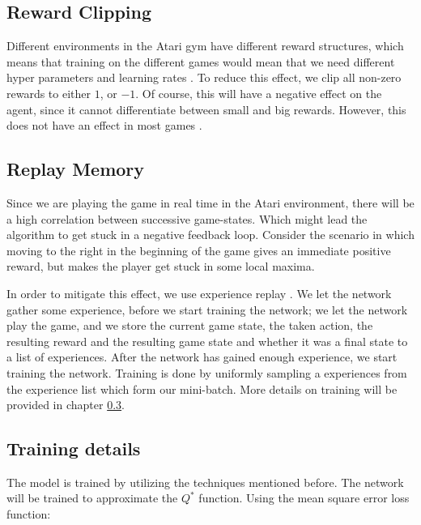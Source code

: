 \documentclass{article}
\begin{document}
\subsection{Reward Clipping}

Different environments in the Atari gym have different reward structures, which means that training on the different games would mean that we need different hyper parameters and learning rates . To reduce this effect, we clip all non-zero rewards to either $1$, or $-1$. Of course, this will have a negative effect on the agent, since it cannot differentiate between small and big rewards. However, this does not have an effect in most games \cite{mnih2015human}.


\subsection{Replay Memory}
Since we are playing the game in real time in the Atari environment, there will be a high correlation between successive game-states. Which might lead the algorithm to get stuck in a negative feedback loop. Consider the scenario in which moving to the right in the beginning of the game gives an immediate positive reward, but makes the player get stuck in some local maxima.

In order to mitigate this effect, we use experience replay \cite{mnih2013playing}. We let the network gather some experience, before we start training the network; we let the network play the game, and we store the current game state, the taken action, the resulting reward and the resulting game state and whether it was a final state to a list of experiences. After the network has gained enough experience, we start training the network. Training is done by uniformly sampling a experiences from the experience list which form our mini-batch. More details on training will be provided in chapter \ref{chapter:training}.

\subsection{Training details} \label{chapter:training}

The model is trained by utilizing the techniques mentioned before. The network will be trained to approximate the $Q^*$ function. Using the mean square error loss function:
\end{document}
